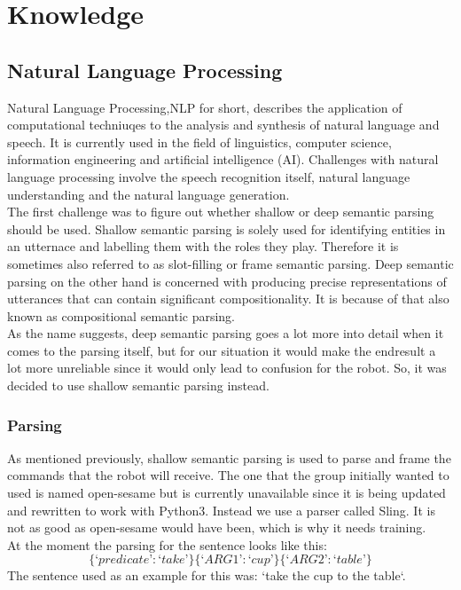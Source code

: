 \documentclass[main.tex]{subfiles}
\begin{document}
	
	\chapter{Knowledge}
		
		\section{Natural Language Processing}
		Natural Language Processing,NLP for short, describes the application of computational techniuqes to the analysis and synthesis of natural language and speech. It is currently used in the field of linguistics, computer science, information engineering and artificial intelligence (AI). Challenges with natural language processing involve the speech recognition itself, natural language understanding and the natural language generation.\\
		The first challenge was to figure out whether shallow or deep semantic parsing should be used. Shallow semantic parsing is solely used for identifying entities in an utternace and labelling them with the roles they play. Therefore it is sometimes also referred to as slot-filling or frame semantic parsing. Deep semantic parsing on the other hand is concerned with producing precise representations of utterances that can contain significant compositionality. It is because of that also known as compositional semantic parsing.\\
		As the name suggests, deep semantic parsing goes a lot more into detail when it comes to the parsing itself, but for our situation it would make the endresult a lot more unreliable since it would only lead to confusion for the robot. So, it was decided to use shallow semantic parsing instead.
		
		
		\subsection{Parsing}
		As mentioned previously, shallow semantic parsing is used to parse and frame the commands that the robot will receive. The one that the group initially wanted to used is named open-sesame but is currently unavailable since it is being updated and rewritten to work with Python3. Instead we use a parser called Sling. It is not as good as open-sesame would have been, which is why it needs training.\\
		At the moment the parsing for the sentence looks like this:
		\begin{equation}
		\{‘predicate’: ‘take’\} \{‘ARG1’: ‘cup’\} \{‘ARG2’: ‘table’\}
		\end{equation}		
		The sentence used as an example for this was: ‘take the cup to the table‘.
		
\end{document}
